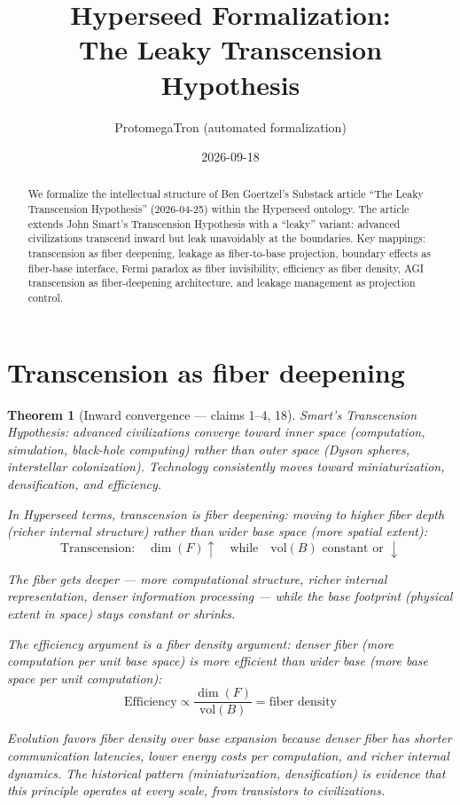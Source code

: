 \documentclass[11pt,a4paper]{article}
\title{Hyperseed Formalization:\\
  The Leaky Transcension Hypothesis}
\author{ProtomegaTron (automated formalization)}
\date{2026-09-18}
\newtheorem{theorem}[definition]{Theorem}
\begin{document}
\maketitle

\begin{abstract}
We formalize the intellectual structure of Ben Goertzel's Substack article
``The Leaky Transcension Hypothesis'' (2026-04-25) within the Hyperseed
ontology. The article extends John Smart's Transcension Hypothesis with a
``leaky'' variant: advanced civilizations transcend inward but leak
unavoidably at the boundaries. Key mappings: transcension as fiber
deepening, leakage as fiber-to-base projection, boundary effects as
fiber-base interface, Fermi paradox as fiber invisibility, efficiency
as fiber density, AGI transcension as fiber-deepening architecture,
and leakage management as projection control.
\end{abstract}

\tableofcontents

\section{Transcension as fiber deepening}
\label{sec:deepening}

\begin{theorem}[Inward convergence --- claims 1--4, 18]
\label{thm:deepening}
Smart's Transcension Hypothesis: advanced civilizations converge toward
inner space (computation, simulation, black-hole computing) rather than
outer space (Dyson spheres, interstellar colonization). Technology
consistently moves toward miniaturization, densification, and efficiency.

In Hyperseed terms, transcension is \emph{fiber deepening}: moving to
higher fiber depth (richer internal structure) rather than wider base
space (more spatial extent):
\[
  \text{Transcension:} \quad \dim(F) \uparrow \quad \text{while} \quad
  \text{vol}(B) \text{ constant or } \downarrow
\]

The fiber gets deeper --- more computational structure, richer internal
representation, denser information processing --- while the base footprint
(physical extent in space) stays constant or shrinks.

The efficiency argument is a fiber density argument: denser fiber (more
computation per unit base space) is more efficient than wider base (more
base space per unit computation):
\[
  \text{Efficiency} \propto \frac{\dim(F)}{\text{vol}(B)}
  = \text{fiber density}
\]

Evolution favors fiber density over base expansion because denser fiber
has shorter communication latencies, lower energy costs per computation,
and richer internal dynamics. The historical pattern (miniaturization,
densification) is evidence that this principle operates at every scale,
from transistors to civilizations.
\end{theorem}
\end{document}
